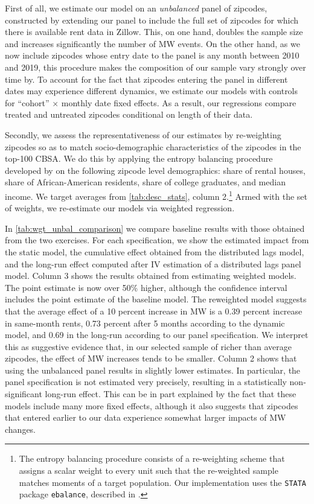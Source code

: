 First of all, we estimate our model on an \textit{unbalanced} panel of zipcodes, constructed by 
extending our panel to include the full set of zipcodes for which there is available rent data in 
Zillow. This, on one hand, doubles the sample size and increases significantly the number of MW 
events. %
On the other hand, as we now include zipcodes whose entry date to the panel is any month between
2010 and 2019, this procedure makes the composition of our sample vary strongly over time by. To 
account for the fact that zipcodes entering the panel in different dates may experience different 
dynamics, we estimate our models with controls for ``cohort'' $\times$ monthly date fixed effects. 
As a result, our regressions compare treated and untreated zipcodes conditional on length of their 
data.

Secondly, we assess the representativeness of our estimates by re-weighting zipcodes so as to match 
socio-demographic characteristics of the zipcodes in the top-100 CBSA. We do this by applying the 
entropy balancing procedure developed by \cite{hainmueller2012entropy} on the following zipcode 
level demographics: share of rental houses, share of African-American residents, share of college 
graduates, and median income. We target averages from \autoref{tab:desc_stats}, column 
2.\footnote{The entropy balancing procedure consists of a re-weighting scheme that assigns a scalar 
	weight to every unit such that the re-weighted sample matches moments of a target population. 
	Our implementation uses the \texttt{STATA} package \texttt{ebalance}, described in 
	\textcite{hainmueller2013ebalance}.} 
Armed with the set of weights, we re-estimate our models via weighted regression.

In \autoref{tab:wgt_unbal_comparison} we compare baseline results with those obtained from the 
two exercises. For each specification, we show the estimated impact from the static model, the 
cumulative effect obtained from the distributed lags model, and the long-run effect computed after
IV estimation of a distributed lags panel model. Column 3 shows the results obtained from 
estimating weighted models. The point estimate is now over 50\% higher, although the confidence 
interval includes the point estimate of the baseline model. The reweighted model suggests that the 
average effect of a 10 percent increase in MW is a 0.39 percent increase in same-month rents, 0.73 
percent after 5 months according to the dynamic model, and 0.69 in the long-run according to our 
panel specification. We interpret this as suggestive evidence that, in our selected sample of 
richer than average zipcodes, the effect of MW increases tends to be smaller. Column 2 shows that 
using the unbalanced panel results in slightly lower estimates. In particular, the panel 
specification is not estimated very precisely, resulting in a statistically non-significant 
long-run effect. This can be in part explained by the fact that these models include many more 
fixed effects, although it also suggests that zipcodes that entered earlier to our data experience 
somewhat larger impacts of MW changes.

